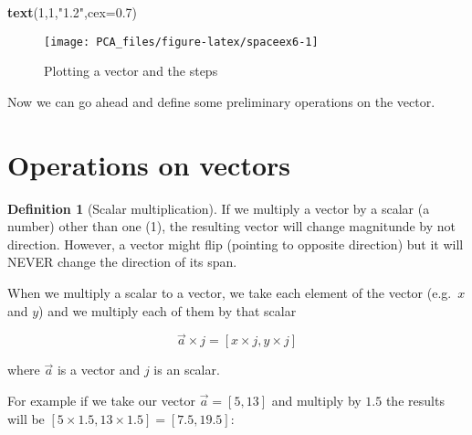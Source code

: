 \documentclass[
]{book}
\newenvironment{Shaded}{\begin{snugshade}}{\end{snugshade}}
\newcommand{\DataTypeTok}[1]{\textcolor[rgb]{0.13,0.29,0.53}{#1}}
\newcommand{\DecValTok}[1]{\textcolor[rgb]{0.00,0.00,0.81}{#1}}
\newcommand{\FloatTok}[1]{\textcolor[rgb]{0.00,0.00,0.81}{#1}}
\newcommand{\KeywordTok}[1]{\textcolor[rgb]{0.13,0.29,0.53}{\textbf{#1}}}
\newcommand{\NormalTok}[1]{#1}
\newcommand{\StringTok}[1]{\textcolor[rgb]{0.31,0.60,0.02}{#1}}
\theoremstyle{definition}
\newtheorem{definition}{Definition}[chapter]
\theoremstyle{definition}
\theoremstyle{definition}
\theoremstyle{remark}
\begin{document}
\begin{Shaded}
\begin{Highlighting}[]
\KeywordTok{text}\NormalTok{(}\DecValTok{1}\NormalTok{,}\DecValTok{1}\NormalTok{,}\StringTok{"1.2"}\NormalTok{,}\DataTypeTok{cex=}\FloatTok{0.7}\NormalTok{)}
\end{Highlighting}
\end{Shaded}

\begin{figure}

{\centering \texttt{[image: PCA\_files/figure-latex/spaceex6-1]} 

}

\caption{Plotting a vector and the steps}\label{fig:spaceex6}
\end{figure}

Now we can go ahead and define some preliminary operations on the vector.

\hypertarget{operations-on-vectors}{%
\section{Operations on vectors}\label{operations-on-vectors}}

\begin{definition}[Scalar multiplication]
\protect\hypertarget{def:scalarv}{}{\label{def:scalarv} \iffalse (Scalar multiplication) \fi{} }If we multiply a vector by a scalar (a number) other than one (1), the resulting vector will change magnitunde by not direction. However, a vector might flip (pointing to opposite direction) but it will NEVER change the direction of its span.

When we multiply a scalar to a vector, we take each element of the vector (e.g.~\(x\) and \(y\)) and we multiply each of them by that scalar

\[\vec{a} \times j=[x\times j,y\times j]\]

where \(\vec{a}\) is a vector and \(j\) is an scalar.
\end{definition}

For example if we take our vector \(\vec{a}=[5,13]\) and multiply by \(1.5\) the results will be \([5 \times 1.5, 13 \times 1.5]=[7.5,19.5]\):
\end{document}
